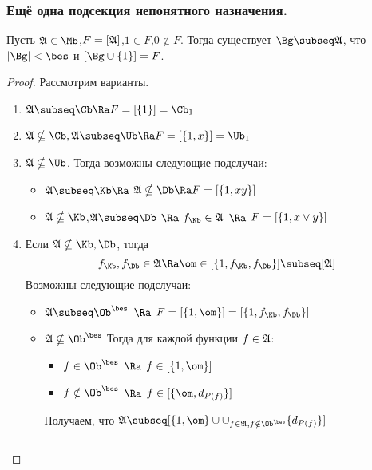 \documentclass[unicode,10pt]{article}
\begin{document}
\subsubsection{Ещё одна подсекция непонятного назначения.}
\begin{theorem}
  \label{thm}
  Пусть $\ag\in\Mb$,$F=[\mathfrak{A}]$,$1\in F$,$0\notin F$. Тогда существует $\Bg\subseq\ag$, что
  $|\Bg|<\bes$ и $[\Bg\cup\{1\}]=F$.
\end{theorem}
\begin{proof}
Рассмотрим варианты.
\begin{enumerate}
  \item
    \begin{math}
      \ag\subseq\Cb \Ra F=\cls{1}=\Cb_1
    \end{math}
  \item
    \begin{math}
      \ag\nsubseq\Cb,\ag\subseq\Ub \Ra F=\cls{1,x}=\Ub_1
    \end{math}
  \item $\ag\nsubseq\Ub$. Тогда возможны следующие подслучаи:
    \begin{itemize}
      \item  $\ag\subseq\Kb \Ra $ \WHY $\ag\nsubseq\Db\Ra F=\cls{1,xy}$
      \item $\ag\nsubseq\Kb$,$\ag\subseq\Db$ $\Ra$ $\fK\in\ag$ $\Ra$ $F=[\{1,x\vee{y}\}]$
    \end{itemize}
  \item Если $\ag\nsubseq\Kb,\Db$, тогда \WHY
    \begin{displaymath}
      \fK,\fD\in\ag \Ra \om\in\cls{1,\fK,\fD}\subseq[\ag]
    \end{displaymath}
   Возможны следующие подслучаи:
   \begin{itemize}
        \item $\ag\subseq\Oib$ $\Ra$ $F=\cls{1,\om}=\cls{1,\fK,\fD}$
        \item $\ag\nsubseq\Oib$ Тогда для каждой функции $f\in\mathfrak{A}$:
        \begin{itemize}
          \item $f\in\Oib$ $\Ra$ $f\in\cls{1,\om}$
          \item $f\notin\Oib$ $\Ra$ $f\in\cls{\om,d_{P(f)}}$
        \end{itemize}
        Получаем, что $\ag\subseq[\{1,\om\}\cup\cup_{f\in\ag,f\notin\Oib}\{d_{P(f)}\}]$
   \end{itemize}
   \begin{df}
     \begin{math}

\end{math}
\end{df}
\end{enumerate}
\end{proof}
\end{document}
